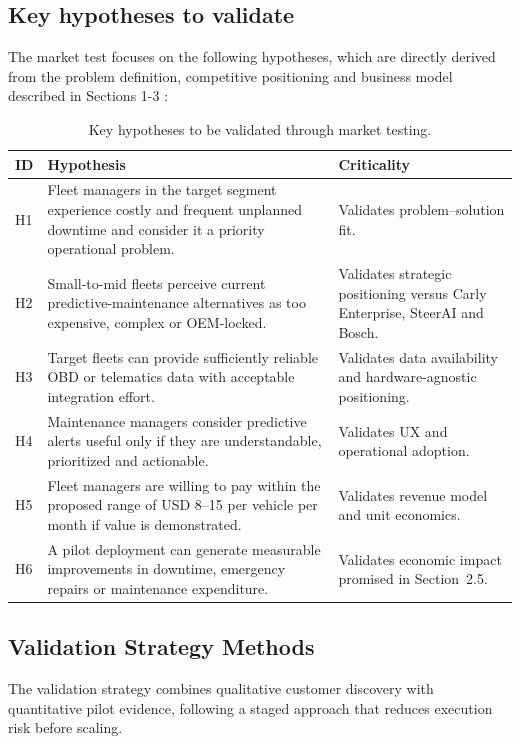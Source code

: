 \documentclass[11pt,a4paper]{article}
\begin{document}
\subsection{Key hypotheses to validate}
\noindent The market test focuses on the following hypotheses, which are directly derived from the problem definition, competitive positioning and business model described in Sections 1-3 :
\\
\begin{table}[h!]
\centering
\small
\begin{tabularx}{\linewidth}{l X X}
\toprule
\textbf{ID} & \textbf{Hypothesis} & \textbf{Criticality} \\
\midrule
H1 &
Fleet managers in the target segment experience costly and frequent unplanned downtime and consider it a priority operational problem. &
Validates problem--solution fit. \\

H2 &
Small-to-mid fleets perceive current predictive-maintenance alternatives as too expensive, complex or OEM-locked. &
Validates strategic positioning versus Carly Enterprise, SteerAI and Bosch. \\

H3 &
Target fleets can provide sufficiently reliable OBD or telematics data with acceptable integration effort. &
Validates data availability and hardware-agnostic positioning. \\

H4 &
Maintenance managers consider predictive alerts useful only if they are understandable, prioritized and actionable. &
Validates UX and operational adoption. \\

H5 &
Fleet managers are willing to pay within the proposed range of USD 8--15 per vehicle per month if value is demonstrated. &
Validates revenue model and unit economics. \\

H6 &
A pilot deployment can generate measurable improvements in downtime, emergency repairs or maintenance expenditure. &
Validates economic impact promised in Section~2.5. \\

\bottomrule
\end{tabularx}
\caption{Key hypotheses to be validated through market testing.}
\label{tab:hypotheses}
\end{table}

\subsection{Validation Strategy Methods}
\noindent The validation strategy combines qualitative customer discovery with quantitative pilot evidence, following a staged approach that reduces execution risk before scaling.
\end{document}
